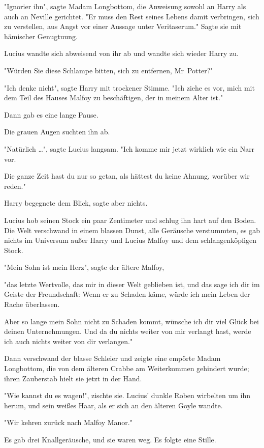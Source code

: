 {"Ignorier ihn", sagte Madam Longbottom, die Anweisung sowohl an Harry als auch an Neville gerichtet. "Er muss den Rest seines Lebens damit verbringen, sich zu verstellen, aus Angst vor einer Aussage unter Veritaserum." Sagte sie mit hämischer Genugtuung.

Lucius wandte sich abweisend von ihr ab und wandte sich wieder Harry zu.

"Würden Sie diese Schlampe bitten, sich zu entfernen, Mr~Potter?"

"Ich denke nicht", sagte Harry mit trockener Stimme. "Ich ziehe es vor, mich mit dem Teil des Hauses Malfoy zu beschäftigen, der in meinem Alter ist."

Dann gab es eine lange Pause.

Die grauen Augen suchten ihn ab.

"Natürlich …", sagte Lucius langsam. "Ich komme mir jetzt wirklich wie ein Narr vor.

Die ganze Zeit hast du nur so getan, als hättest du keine Ahnung, worüber wir reden."

Harry begegnete dem Blick, sagte aber nichts.

Lucius hob seinen Stock ein paar Zentimeter und schlug ihn hart auf den Boden. Die Welt verschwand in einem blassen Dunst, alle Geräusche verstummten, es gab nichts im Universum außer Harry und Lucius Malfoy und dem schlangenköpfigen Stock.

"Mein Sohn ist mein Herz", sagte der ältere Malfoy,

"das letzte Wertvolle, das mir in dieser Welt geblieben ist, und das sage ich dir im Geiste der Freundschaft: Wenn er zu Schaden käme, würde ich mein Leben der Rache überlassen.

Aber so lange mein Sohn nicht zu Schaden kommt, wünsche ich dir viel Glück bei deinen Unternehmungen. Und da du nichts weiter von mir verlangt hast, werde ich auch nichts weiter von dir verlangen."

Dann verschwand der blasse Schleier und zeigte eine empörte Madam Longbottom, die von dem älteren Crabbe am Weiterkommen gehindert wurde; ihren Zauberstab hielt sie jetzt in der Hand.

"Wie kannst du es wagen!", zischte sie. Lucius' dunkle Roben wirbelten um ihn herum, und sein weißes Haar, als er sich an den älteren Goyle wandte.

"Wir kehren zurück nach Malfoy Manor."

Es gab drei Knallgeräusche, und sie waren weg. Es folgte eine Stille.

}
